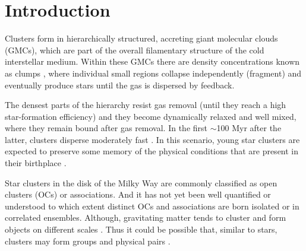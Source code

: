 \documentclass[twocolumn]{aastex631}
\begin{document}

\section{Introduction} \label{sec:intro}

Clusters form in hierarchically structured, accreting giant molecular clouds (GMCs), which are part of the overall filamentary structure of the cold interstellar medium.  Within these GMCs there are density concentrations known as clumps  \citep{2019ARA&A..57..227K}, where individual small regions  collapse independently (fragment) and eventually produce stars until the gas is dispersed by feedback. 

The densest parts of the hierarchy resist gas removal (until they reach a high star-formation efficiency) and they become dynamically relaxed and well mixed, where they remain bound after gas removal. In the first $\sim$100 Myr after the latter, clusters disperse moderately fast \citep{2019ARA&A..57..227K}. In this scenario, young star clusters are expected to preserve some memory of the physical conditions that are present in their birthplace \citep{2010MNRAS.403..996B}. 

Star clusters in the disk of the Milky Way are commonly classified as open clusters (OCs) or associations. And it has not yet been well quantified or understood to which extent distinct OCs and associations are born isolated or in correlated ensembles. Although, gravitating matter tends to cluster and form objects on different scales \citep{2020A&A...642L...4K}. Thus it could be possible that, similar to stars, clusters may form groups and physical pairs \citep{1996ApJ...466..802E,1997AJ....113..249F,2010MNRAS.403..996B,2013MNRAS.434..313G}. 
\end{document}
